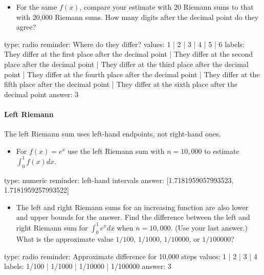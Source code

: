 \documentclass[12pt]{article}
\begin{document}
\begin{itemize}
\itemsep1pt\parskip0pt
\item
  For the same $f(x)$, compare your estimate with 20 Riemann sums to
  that with 20,000 Riemann sums. How many digits after the decimal point
  do they agree?
\end{itemize}

\begin{answer}
type: radio
reminder: Where do they differ?
values: 1 | 2 | 3 | 4 | 5 | 6
labels: They differ at the first place after the decimal point | They differ at the second place after the decimal point | They differ at the third place after the decimal point | They differ at the fourth place after the decimal point | They differ at the fifth place after the decimal point | They differ at the sixth place after the decimal point
answer: 3
\end{answer}

\paragraph{Left Riemann}

The left Riemann sum uses left-hand endpoints, not right-hand ones.

\begin{itemize}
\itemsep1pt\parskip0pt
\item
  For $f(x) = e^{x}$ use the left Riemann sum with $n=10,000$ to
  estimate $\int_0^1 f(x) dx$.
\end{itemize}

\begin{answer}
    type: numeric
    reminder: left-hand intervals
    answer: [1.7181959057993523, 1.7181959257993522]

\end{answer}

\begin{itemize}
\itemsep1pt\parskip0pt
\item
  The left and right Riemann sums for an increasing function are also
  lower and upper bounds for the answer. Find the difference between the
  left and right Riemann sum for $\int_0^1 e^x dx$ when $n=10,000$. (Use
  your last answer.) What is the approximate value $1/100$, $1/1000$,
  $1/10000$, or $1/100000$?
\end{itemize}

\begin{answer}
type: radio
reminder: Approximate difference for 10,000 steps
values: 1 | 2 | 3 | 4
labels: 1/100 | 1/1000 | 1/10000 | 1/100000
answer: 3
\end{answer}
\end{document}
